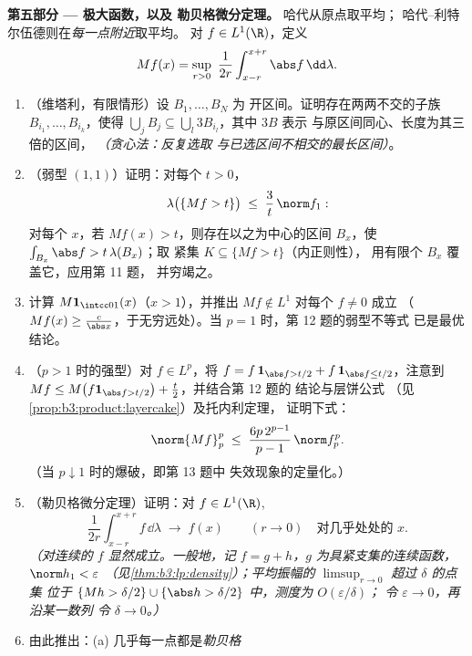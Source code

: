 \begin{problem}
\medskip
\noindent\textbf{第五部分 --- 极大函数，以及
勒贝格微分定理。} 哈代从原点取平均；
哈代--利特尔伍德则在\emph{每一点附近}取平均。
对 $f \in L^1(\R)$，定义
\[
Mf(x) = \sup_{r>0}\ \frac1{2r}\int_{x-r}^{x+r}\abs
f\,\dd\lambda .
\]
\begin{enumerate}[resume]
  \item （维塔利，有限情形）设 $B_1, \dots, B_N$ 为
        开区间。证明存在两两不交的子族
        $B_{i_1}, \dots, B_{i_k}$，使得 $\bigcup_jB_j
        \subseteq \bigcup_l3B_{i_l}$，其中 $3B$ 表示
        与原区间同心、长度为其三倍的区间，
        \emph{（贪心法：反复选取
        与已选区间不相交的最长区间）}。
  \item （弱型 $(1,1)$）证明：对每个 $t > 0$，
        \[
        \lambda\bigl(\{Mf > t\}\bigr) \;\leq\;
        \frac3t\,\norm f_1 :
        \]
        对每个 $x$，若 $Mf(x) > t$，则存在以之为中心的区间
        $B_x$，使 $\int_{B_x}\abs f > t\,\lambda(B_x)$；取
        紧集 $K \subseteq \{Mf > t\}$（内正则性），
        用有限个 $B_x$ 覆盖它，应用第 11 题，
        并穷竭之。
  \item 计算 $M\mathbf 1_{\intcc01}(x)$（$x > 1$），并推出
        $Mf \notin L^1$ 对每个 $f \neq 0$ 成立
        （$Mf(x) \geq \frac c{\abs x}$，于无穷远处）。当 $p =
        1$ 时，第 12 题的弱型不等式
        已是最优结论。
  \item （$p > 1$ 时的强型）对 $f \in L^p$，将 $f =
        f\,\mathbf 1_{\abs f > t/2} + f\,\mathbf 1_{\abs f
        \leq t/2}$，注意到 $Mf \leq M\bigl(f\mathbf 1_{\abs
        f > t/2}\bigr) + \frac t2$，并结合第 12 题的
        结论与层饼公式
        （见\cref{prop:b3:product:layercake}）及托内利定理，
        证明下式：
        \[
        \norm{Mf}_p^p \;\leq\;
        \frac{6p\,2^{p-1}}{p-1}\,\norm f_p^p .
        \]
        （当 $p \downarrow 1$ 时的爆破，即第 13 题中
        失效现象的定量化。）
  \item （勒贝格微分定理）证明：对 $f \in
        L^1(\R)$,
        \[
        \frac1{2r}\int_{x-r}^{x+r}f\,\dd\lambda
        \;\longrightarrow\; f(x)
        \qquad (r \to 0)\quad\text{对几乎处处的\ }x .
        \]
        \emph{（对连续的 $f$ 显然成立。一般地，记 $f
        = g + h$，$g$ 为具紧支集的连续函数，
        $\norm h_1 < \varepsilon$
        （见\cref{thm:b3:lp:density}）；平均振幅的
        $\limsup_{r\to0}$ 超过 $\delta$ 的点集
        位于 $\{Mh > \delta/2\} \cup \{\abs h
        > \delta/2\}$ 中，测度为 $O(\varepsilon/\delta)$；
        令 $\varepsilon \to 0$，再沿某一数列
        令 $\delta \to 0$。）}
  \item 由此推出：(a) 几乎每一点都是\emph{勒贝格
}
\end{enumerate}
\end{problem}
